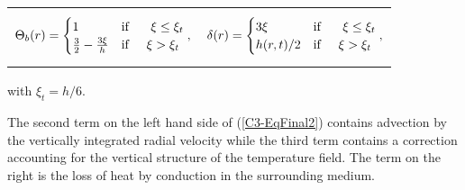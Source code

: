 \begin{tabular}{p{6cm}p{6cm}}
{
\begin{equation}
    \Theta_b(r)=
    \begin{cases}
      1 &\text{if } \hspace{.5cm} \xi\leq \xi_t \nonumber\\
      \frac{3}{2}-\frac{3\xi}{h} & \text{if} \hspace{.5cm} \xi > \xi_t\nonumber
    \end{cases},
  \end{equation}
                                   }
&
{
  \begin{equation}
    \delta(r)=
    \begin{cases}
      3\xi &\text{if } \hspace{.5cm} \xi\leq \xi_t \nonumber\\
      h(r,t)/2 & \text{if} \hspace{.5cm} \xi > \xi_t\nonumber\\
    \end{cases},
  \end{equation}
  }
\end{tabular}
with $\xi_t = h/6$.

The second term on the  left hand side of (\ref{C3-EqFinal2}) contains
advection by the vertically integrated radial velocity while the third
term contains  a correction accounting  for the vertical  structure of
the temperature field.  The  term on the right is the  loss of heat by
conduction in the surrounding medium.

